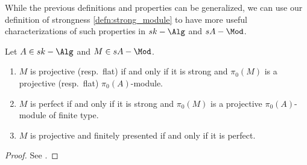         While the previous definitions and properties can be generalized, we can use our definition of strongness \cref{defn:strong_module} to have more useful characterizations of such properties in $sk-\Alg$ and $sA-\Mod$.
        \begin{lemma}
            \label{lemma:properties_homotopical_simplicial_modules}
            Let $A \in sk-\Alg$ and $M \in sA-\Mod$.
            \begin{enumerate}
                \item $M$ is projective (resp.\ flat) if and only if it is strong and $\pi_0(M)$ is a projective (resp.\ flat) $\pi_0(A)$-module.
                \item $M$ is perfect if and only if it is strong and $\pi_0(M)$ is a projective $\pi_0(A)$-module of finite type.
                \item $M$ is projective and finitely presented if and only if it is perfect.
            \end{enumerate}
        \end{lemma}
        \begin{proof}
            See \cite[Lemma~2.2.2.2]{ToVe:hag2}.
        \end{proof}


